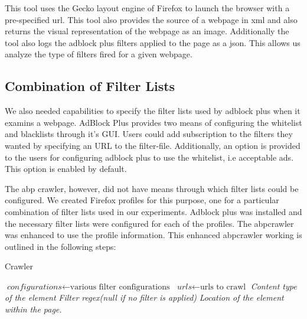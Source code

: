This tool uses the Gecko layout engine of Firefox to launch the browser with a pre-specified url. This tool also
provides the  source of a webpage in xml and also returns the visual representation of the webpage as an image.
Additionally the tool also logs the  adblock plus filters applied to the page as a json. This allows us analyze the type of filters fired for a given webpage.

\subsection{Combination of Filter Lists}
We also needed capabilities to specify the filter lists used by adblock plus when it examins a webpage.
AdBlock Plus provides two means of configuring the whitelist and blacklists through it's GUI. Users  could add subscription to the filters they wanted by specifying an  URL to the filter-file.
Additionally, an option is provided to the users for configuring adblock plus to use the whitelist, i.e acceptable ads. This option is enabled by default.

The abp crawler, however, did not have means through which filter lists could be configured.
We created Firefox profiles for this purpose, one for a particular combination of filter lists used in our experiments. Adblock plus was installed and the necessary filter lists were configured for each of the profiles.
The abpcrawler was enhanced to use the profile information.
This enhanced abpcrawler working is outlined in the following steps:
\begin{algorithm}
\caption{Crawler}\label{euclid}
\begin{algorithmic}[1]
\State $\textit{configurations} \gets \text{various filter configurations}$
\State $\textit{urls} \gets \text{urls to crawl}$
\State {}
\State {}
\State \textit{Content type of the element}
\State \textit{Filter regex(null if no filter is applied)}
\State \textit{Location of the element within the page.}
\EndFor
\EndFor
\Return
\EndProcedure
\end{algorithmic}
\end{algorithm}

